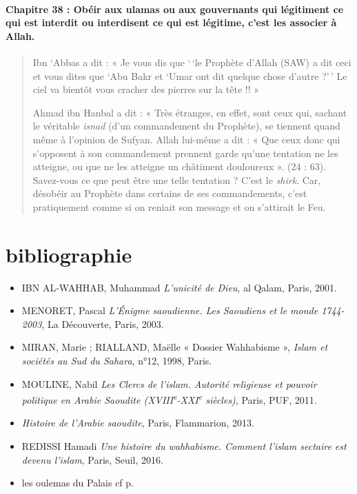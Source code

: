\paragraph{{Chapitre 38} : Obéir aux ulamas ou aux gouvernants
qui légitiment ce qui est interdit ou interdisent ce qui est légitime,
c'est les associer à Allah.}
\begin{quote}
Ibn `Abbas a dit : « Je vous dis que `\,`le Prophète d'Allah (SAW) a dit
ceci et vous dites que `Abu Bakr et `Umar ont dit quelque chose d'autre
?'\,' Le ciel va bientôt vous cracher des pierres sur la tête !! »

Ahmad ibn Hanbal a dit : « Très étranges, en effet, sont ceux qui,
sachant le véritable \emph{isnad} (d'un commandement du Prophète), se
tiennent quand même à l'opinion de Sufyan. Allah lui-même a dit : « Que
ceux donc qui s'opposent à son commandement prennent garde qu'une
tentation ne les atteigne, ou que ne les atteigne un châtiment
douloureux ». (24 : 63). Savez-vous ce que peut être une telle tentation
? C'est le \emph{shirk}. Car, désobéir au Prophète dans certains de ses
commandements, c'est pratiquement comme si on reniait son message et on
s'attirait le Feu.

\end{quote}


\section{bibliographie}

 

\begin{itemize}
\item
 
  IBN AL-WAHHAB, Muhammad \emph{L'unicité de Dieu}, al Qalam, Paris,
  2001.
 


 \item
MENORET, Pascal \emph{L'Énigme saoudienne. Les Saoudiens et le monde
1744-2003}, La Découverte, Paris, 2003.
\item
MIRAN, Marie ; RIALLAND, Maëlle « Dossier Wahhabisme », \emph{Islam et
sociétés au Sud du Sahara}, n°12, 1998, Paris.
\item
MOULINE, Nabil \emph{Les Clercs de l'islam. Autorité religieuse et
pouvoir politique en Arabie Saoudite
(XVIII\textsuperscript{e}-XXI\textsuperscript{e} siècles)}, Paris, PUF,
2011.
\item
  \emph{Histoire de l'Arabie
saoudite}, Paris, Flammarion, 2013.
\item
REDISSI Hamadi \emph{Une histoire du wahhabisme. Comment l'islam
sectaire est devenu l'islam}, Paris, Seuil, 2016.

\item les oulemas du Palais cf p. \pageref{Art:OulemasPalais}
 \end{itemize}
 
 

